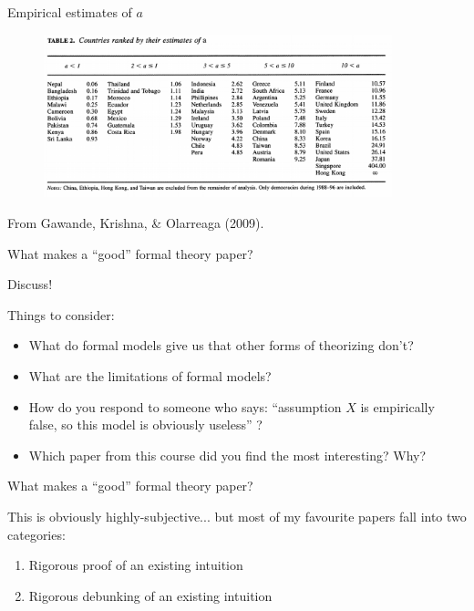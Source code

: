 \documentclass[11pt,aspectratio=169]{beamer}
\begin{document}
\begin{frame}{Empirical estimates of $a$}

\begin{figure}
\includegraphics[width=0.9\textwidth]{table.png}
\end{figure}

\vspace{-1em}
\centering \footnotesize From Gawande, Krishna, \& Olarreaga (2009). 
\end{frame}

\begin{frame}{What makes a ``good'' formal theory paper?}

\Large 

\begin{tcolorbox}
Discuss!
\end{tcolorbox}

\normalsize
Things to consider:
\begin{itemize}
\item What do formal models give us that other forms of theorizing don't?
\item What are the limitations of formal models?
\item How do you respond to someone who says: ``assumption $X$ is empirically false, so this model is obviously useless'' ?
\item Which paper from this course did you find the most interesting? Why?
\end{itemize}

\end{frame}

\begin{frame}{What makes a ``good'' formal theory paper?}

\Large 
This is obviously highly-subjective... but most of my favourite papers fall into two categories:

\begin{enumerate}
\item Rigorous \alert{proof} of an existing intuition
\pause
\item Rigorous \alert{debunking} of an existing intuition
\end{enumerate}
\end{frame}
\end{document}

